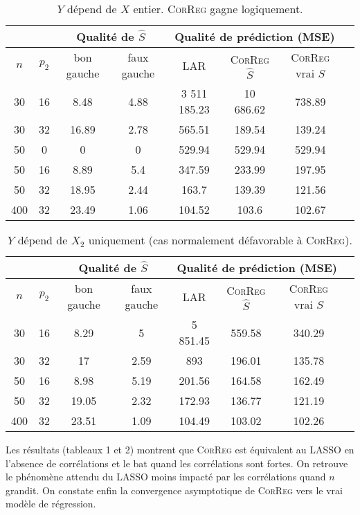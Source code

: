 \documentclass[12pt]{article}
\begin{document}
\begin{table}
\centering
\begin{tabular}{|c|c|c|c|c|c|c|c|}
\cline{3-7}
 \multicolumn{2}{c|}{}  & \multicolumn{2}{c|}{Qualité de $\hat S$} & \multicolumn{3}{c|}{Qualité de prédiction (MSE)} \\
\hline 
$n$ & $p_2$ & bon gauche & faux gauche    & LAR  &    \textsc{CorReg} $\hat S$& \textsc{CorReg} vrai $S$\\ 
\hline 
30 & 16 & 8.48 & 4.88 & 3 511 185.23 & 10 686.62 & 738.89 \\ 
\hline 
30 & 32 & 16.89 & 2.78 & 565.51 & 189.54 & 139.24\\ 
\hline 
\hline 
50 & 0 & 0 & 0 & 529.94 & 529.94 & 529.94 \\ 
\hline 
50 & 16 & 8.89 & 5.4 & 347.59 & 233.99 & 197.95\\ 
\hline 
50 & 32 & 18.95 & 2.44 & 163.7 & 139.39 & 121.56 \\ 
\hline \hline
400 & 32 & 23.49 & 1.06 & 104.52 & 103.6 & 102.67\\ 
\hline 
\end{tabular} 
\caption{$Y$  dépend  de $X$ entier. \textsc{CorReg} gagne logiquement.} \label{tableMSEsimtout}
\end{table}


\begin{table}
\begin{tabular}{|c|c|c|c|c|c|c|c|}
\cline{3-7}
 \multicolumn{2}{c|}{}  & \multicolumn{2}{c|}{Qualité de $\hat S$} & \multicolumn{3}{c|}{Qualité de prédiction (MSE)} \\
\hline 
$n$ & $p_2$ & bon gauche & faux gauche    & LAR  &    \textsc{CorReg} $\hat S$ & \textsc{CorReg} vrai $S$\\ 
\hline 
30 & 16 & 8.29 & 5 & 5 851.45 & 559.58 & 340.29\\ 
\hline 
30 & 32 & 17 & 2.59 & 893 & 196.01 & 135.78 \\ 
\hline 
\hline 
50 & 16 &  8.98 & 5.19 & 201.56 & 164.58 & 162.49\\ 
\hline 
50 & 32 & 19.05 & 2.32 & 172.93 & 136.77 & 121.19\\ 
\hline \hline
400 & 32 & 23.51 & 1.09 & 104.49 & 103.02 & 102.26 \\ 
\hline 
\end{tabular} 
\caption{$Y$  dépend  de $X_2$ uniquement (cas normalement défavorable à \textsc{CorReg}). } \label{tableMSEsimgauche}
\end{table}


Les résultats (tableaux 1 et 2) montrent que \textsc{CorReg} est équivalent au LASSO en l'absence de corrélations et le bat quand les corrélations sont fortes. On retrouve le phénomène attendu du LASSO moins impacté par les corrélations quand $n$ grandit. On constate enfin la convergence asymptotique de \textsc{CorReg} vers le vrai modèle de régression.%
\end{document}
